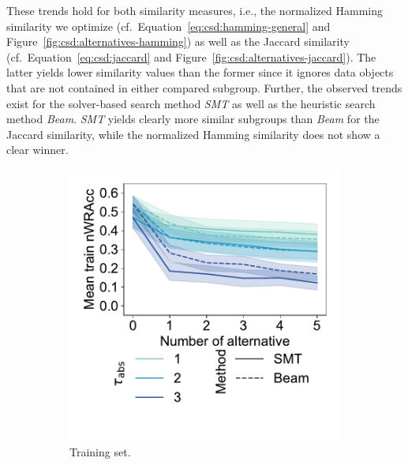 \documentclass{article}
\theoremstyle{definition}
\begin{document}
These trends hold for both similarity measures, i.e., the normalized Hamming similarity we optimize (cf.~Equation~\ref{eq:csd:hamming-general} and Figure~\ref{fig:csd:alternatives-hamming}) as well as the Jaccard similarity (cf.~Equation~\ref{eq:csd:jaccard} and Figure~\ref{fig:csd:alternatives-jaccard}).
The latter yields lower similarity values than the former since it ignores data objects that are not contained in either compared subgroup.
Further, the observed trends exist for the solver-based search method \emph{SMT} as well as the heuristic search method \emph{Beam}.
\emph{SMT} yields clearly more similar subgroups than \emph{Beam} for the Jaccard similarity, while the normalized Hamming similarity does not show a clear winner.

\begin{figure}[t]
	\centering
	\begin{subfigure}[t]{0.48\textwidth}
		\centering
		\includegraphics[width=\textwidth, trim=15 50 15 15, clip]{plots/csd-alternatives-train-nwracc.pdf}
		\caption{Training set.}
		\label{fig:csd:alternatives-train-nwracc}
	\end{subfigure}
	\hfill
	\begin{subfigure}[t]{0.48\textwidth}
		\centering

\end{subfigure}
\end{figure}
\end{document}
